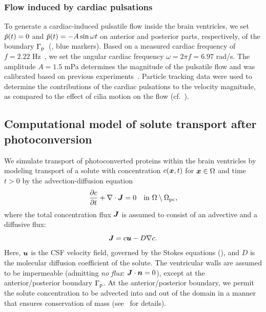 \documentclass{WileyMSP-template}
\begin{document}
\subsubsection{Flow induced by cardiac pulsations}
To generate a cardiac-induced pulsatile flow inside the brain ventricles, we set $\Tilde{p}(t)=0$ and
$\Tilde{p}(t)=-A\sin{\omega t}$ on anterior and posterior parts, respectively, of the
boundary $\Gamma_{\mathrm{p}}$~(, blue markers).
Based on a measured cardiac frequency of $f=2.22$ Hz~\cite{Olstad2019CiliaryDevelopment},
we set the angular cardiac frequency $\omega=2\pi f=6.97$ rad/s. The amplitude $A=1.5$ mPa determines the magnitude of the pulsatile flow
and was calibrated based on previous experiments~\cite{Olstad2019CiliaryDevelopment}.
Particle tracking data were used to determine the contributions of the
cardiac pulsations to the velocity magnitude,
as compared to the effect of cilia motion on the flow (cf.~).

\subsection{Computational model of solute transport after photoconversion}
We simulate transport of photoconverted proteins within the brain ventricles by
modeling transport of a solute with concentration $c(\bm{x}, t)$ for $\bm{x}\in\Omega$ and
time $t > 0$ by the advection-diffusion equation
\begin{equation}
    \frac{\partial c}{\partial t} + \nabla\cdot\bm{J} = 0 \quad \text{in } \Omega\setminus\Omega_{\mathrm{pc}},
    \label{eq:adv_diff_strong}
\end{equation}
where the total concentration flux $\bm{J}$ is assumed to consist of an advective and a diffusive flux:
\begin{equation*}
    \bm{J} = c\bm{u} - D\nabla c .
\end{equation*}
Here, $\bm{u}$ is the CSF velocity field, governed by the Stokes equations (),
and $D$ is the molecular diffusion coefficient of the solute. 
The ventricular walls are assumed to be impermeable (admitting \emph{no flux}: $\bm{J}\cdot\bm{n}=0$),
except at the anterior/posterior boundary $\Gamma_{\mathrm{p}}$.
At the anterior/posterior boundary, we permit the solute concentration to be advected into
and out of the domain in a manner that ensures conservation of mass
(see~ for details).
\end{document}
